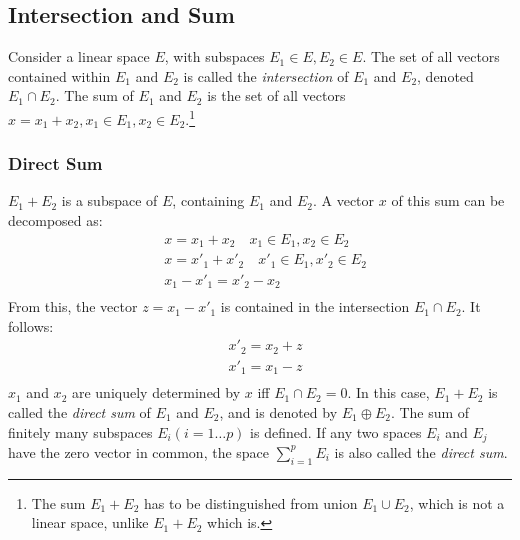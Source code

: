 \documentclass{article}
\begin{document}
\subsection{Intersection and Sum}
Consider a linear space \(E\), with subspaces \(E_1\in E,E_2\in E\). The set of all vectors contained within \(E_1\) and \(E_2\) is called the \emph{intersection} of \(E_1\) and \(E_2\), denoted \(E_1\cap E_2\). The sum of \(E_1\) and \(E_2\) is the set of all vectors \(x=x_1 +x_2, x_1\in E_1, x_2\in E_2\).\footnote{The sum \(E_1 + E_2\) has to be distinguished from union \(E_1\cup E_2\), which is not a linear space, unlike \(E_1 +E_2\) which is.}
\subsubsection{Direct Sum}
\(E_1 +E_2\) is a subspace of \(E\), containing \(E_1\) and \(E_2\). A vector \(x\) of this sum can be decomposed as:
\begin{align*}
	&x=x_1 +x_2\quad x_1\in E_1, x_2\in E_2\\
	&x=x'_1 +x'_2\quad x'_1\in E_1, x'_2\in E_2\\
	&x_1 -x'_1=x'_2 -x_2\\
\end{align*}
From this, the vector \(z=x_1-x'_1\) is contained in the intersection \(E_1\cap E_2\). It follows:
\begin{align*}
	&x'_2=x_2+z\\
	&x'_1=x_1-z\\
\end{align*}
\(x_1\) and \(x_2\) are uniquely determined by \(x\) iff \(E_1\cap E_2=0\). In this case, \(E_1+E_2\) is called the \emph{direct sum} of \(E_1\) and \(E_2\), and is denoted by \(E_1\oplus E_2\). The sum of finitely many subspaces \(E_i(i=1\ldots p)\) is defined. If any two spaces \(E_i\) and \(E_j\) have the zero vector in common, the space \(\sum_{i=1}^{p}E_i\) is also called the \emph{direct sum}.
\end{document}
